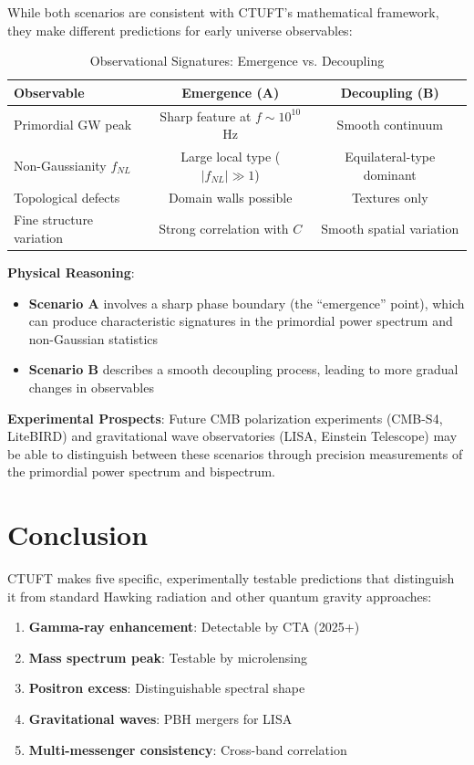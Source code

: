 While both scenarios are consistent with CTUFT's mathematical framework, they make different predictions for early universe observables:

\begin{table}[htbp]
\centering
\caption{Observational Signatures: Emergence vs. Decoupling}
\label{tab:scenario-comparison}
\begin{tabular}{@{}lcc@{}}
\toprule
\textbf{Observable} & \textbf{Emergence (A)} & \textbf{Decoupling (B)} \\
\midrule
Primordial GW peak & Sharp feature at $f \sim 10^{10}$ Hz & Smooth continuum \\
Non-Gaussianity $f_{NL}$ & Large local type ($|f_{NL}| \gg 1$) & Equilateral-type dominant \\
Topological defects & Domain walls possible & Textures only \\
Fine structure variation & Strong correlation with $C$ & Smooth spatial variation \\
\bottomrule
\end{tabular}
\end{table}

\textbf{Physical Reasoning}:
\begin{itemize}
    \item \textbf{Scenario A} involves a sharp phase boundary (the ``emergence'' point), which can produce characteristic signatures in the primordial power spectrum and non-Gaussian statistics
    \item \textbf{Scenario B} describes a smooth decoupling process, leading to more gradual changes in observables
\end{itemize}

\textbf{Experimental Prospects}: Future CMB polarization experiments (CMB-S4, LiteBIRD) and gravitational wave observatories (LISA, Einstein Telescope) may be able to distinguish between these scenarios through precision measurements of the primordial power spectrum and bispectrum.

\section{Conclusion}
\label{sec:exp-conclusion}

CTUFT makes five specific, experimentally testable predictions that distinguish it from standard Hawking radiation and other quantum gravity approaches:

\begin{enumerate}
    \item \textbf{Gamma-ray enhancement}: Detectable by CTA (2025+)
    \item \textbf{Mass spectrum peak}: Testable by microlensing
    \item \textbf{Positron excess}: Distinguishable spectral shape
    \item \textbf{Gravitational waves}: PBH mergers for LISA
    \item \textbf{Multi-messenger consistency}: Cross-band correlation
\end{enumerate}

